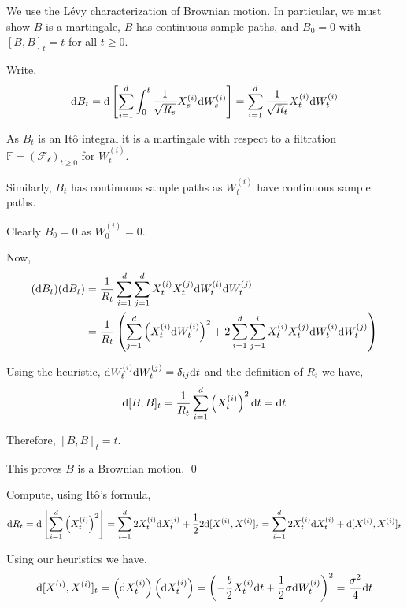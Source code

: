 \documentclass[10pt]{article}
\begin{document}
\begin{solution}[Solution]
We use the  L\'evy characterization of Brownian motion. In particular, we must show \( B \) is a martingale, \( B \) has continuous sample paths, and \( B_0 = 0 \) with \( [B,B]_t = t \) for all \( t\geq 0 \).

Write,
\begin{align*}
    \mathrm{d} B_t = \mathrm{d} \left[ \sum_{i=1}^{d} \int_{0}^{t} \dfrac{1}{\sqrt{R_s}}X_s^{(i)} \mathrm{d} W_s^{(i)} \right] = \sum_{i=1}^{d} \dfrac{1}{\sqrt{R_t}}X_t^{(i)} \mathrm{d} W_t^{(i)}
\end{align*}


As \( B_t \) is an It\^o integral it is a martingale with respect to a filtration \( \mathbb{F} = ( \mathcal{F_t} )_{t\geq 0} \) for \( W_t^{(i)} \).

Similarly, \( B_t \) has continuous sample paths as \( W_t^{(i)} \) have continuous sample paths.

Clearly \( B_0 = 0 \) as \( W_0^{(i)} = 0 \).

Now, 
\begin{align*}
    (\mathrm{d} B_t)(\mathrm{d} B_t) &= \dfrac{1}{R_t} \sum_{i=1}^{d}\sum_{j=1}^{d}X_t^{(i)}X_t^{(j)} \mathrm{d} W_t^{(i)} \mathrm{d} W_t^{(j)} \\
    &= \dfrac{1}{R_t} \left( \sum_{j=1}^{d} \left(X_t^{(i)} \mathrm{d} W_t^{(i)}\right)^2  + 2\sum_{i=1}^{d}\sum_{j=1}^{i} X_t^{(i)}X_t^{(j)} \mathrm{d} W_t^{(i)} \mathrm{d} W_t^{(j)} \right) 
\end{align*}

Using the heuristic, \( \mathrm{d} W_t^{(i)} \mathrm{d} W_t^{(j)} = \delta_{ij} \mathrm{d} t \) and the definition of \( R_t \) we have,
\begin{align*}
    \mathrm{d}[B,B]_t = \dfrac{1}{R_t} \sum_{i=1}^{d} \left( X_t^{(i)} \right)^2 \mathrm{d} t = \mathrm{d} t
\end{align*}

Therefore, \( [B,B]_t = t \).

This proves \( B \) is a Brownian motion. \qed

Compute, using It\^o's formula,
\begin{align*}
    \mathrm{d} R_t 
    = \mathrm{d} \left[ \sum_{i=1}^{d} \left( X_t^{(i)} \right)^2 \right]
    = \sum_{i=1}^{d} 2 X_t^{(i)} \mathrm{d} X_t^{(i)} + \frac{1}{2} 2 \mathrm{d} [X^{(i)},X^{(i)}] _t 
    = \sum_{i=1}^{d} 2X_t^{(i)} \mathrm{d} X_t^{(i)} + \mathrm{d}[X^{(i)},X^{(i)}]_t
\end{align*}

Using our heuristics we have,
\begin{align*}
    \mathrm{d}[X^{(i)},X^{(i)}]_t = \left( \mathrm{d} X_t^{(i)} \right) \left(\mathrm{d} X_t^{(i)} \right) 
    = \left( -\dfrac{b}{2} X_t^{(i)} \mathrm{d} t + \dfrac{1}{2}\sigma \mathrm{d} W_t^{(i)} \right)^2 
    = \dfrac{\sigma^2}{4} \mathrm{d} t
\end{align*}


\end{solution}
\end{document}
